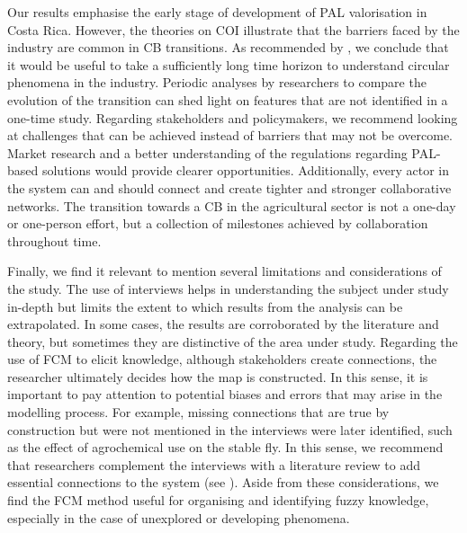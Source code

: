 Our results emphasise the early stage of development of PAL valorisation in Costa Rica. However, the theories on COI illustrate that the barriers faced by the industry are common in CB transitions. As recommended by \cite{blomsma2022making}, we conclude that it would be useful to take a sufficiently long time horizon to understand circular phenomena in the industry. Periodic analyses by researchers to compare the evolution of the transition can shed light on features that are not identified in a one-time study. Regarding stakeholders and policymakers, we recommend looking at challenges that can be achieved instead of barriers that may not be overcome. Market research and a better understanding of the regulations regarding PAL-based solutions would provide clearer opportunities. Additionally, every actor in the system can and should connect and create tighter and stronger collaborative networks. The transition towards a CB in the agricultural sector is not a one-day or one-person effort, but a collection of milestones achieved by collaboration throughout time. 

Finally, we find it relevant to mention several limitations and considerations of the study. The use of interviews helps in understanding the subject under study in-depth but limits the extent to which results from the analysis can be extrapolated. In some cases, the results are corroborated by the literature and theory, but sometimes they are distinctive of the area under study. Regarding the use of FCM to elicit knowledge, although stakeholders create connections, the researcher ultimately decides how the map is constructed. In this sense, it is important to pay attention to potential biases and errors that may arise in the modelling process. For example, missing connections that are true by construction but were not mentioned in the interviews were later identified, such as the effect of agrochemical use on the stable fly. In this sense, we recommend that researchers complement the interviews with a literature review to add essential connections to the system (see \citep{edwards2021building}). Aside from these considerations, we find the FCM method useful for organising and identifying fuzzy knowledge, especially in the case of unexplored or developing phenomena.

